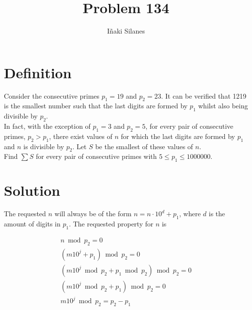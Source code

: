 \documentclass[english]{article}
\begin{document}
\newcommand{\mc}{\multicolumn}
\newcommand{\mr}{\multirow}
\newcommand{\cw}{\columnwidth}
\newcommand{\ig}[2]{\texttt{[image: \#2]}}

\title{Problem 134}
\author{I\~naki Silanes}
\maketitle

\section{Definition}

Consider the consecutive primes $p_1 = 19$ and $p_2 = 23$. It can be verified that 1219 is the smallest number such that the last digits are formed by $p_1$ whilst also being divisible by $p_2$.\\

In fact, with the exception of $p_1 = 3$ and $p_2 = 5$, for every pair of consecutive primes, $p_2 > p_1$, there exist values of $n$ for which the last digits are formed by $p_1$ and $n$ is divisible by $p_2$. Let $S$ be the smallest of these values of $n$.\\

Find $\sum S$ for every pair of consecutive primes with $5 \leq p_1 \leq 1000000$.

\section{Solution}

The requested $n$ will always be of the form $n = n\cdot 10^d + p_1$, where $d$ is the amount of digits in $p_1$. The requested property for $n$ is

\begin{eqnarray}
n \bmod p_2 = 0\\
(m 10^j + p_1) \bmod p_2 = 0\\
(m 10^j \bmod p_2 + p_1 \bmod p_2) \bmod p_2 = 0\\
(m 10^j \bmod p_2 + p_1) \bmod p_2 = 0\\
m 10^j \bmod p_2 = p_2 - p_1
\end{eqnarray}
\end{document}
